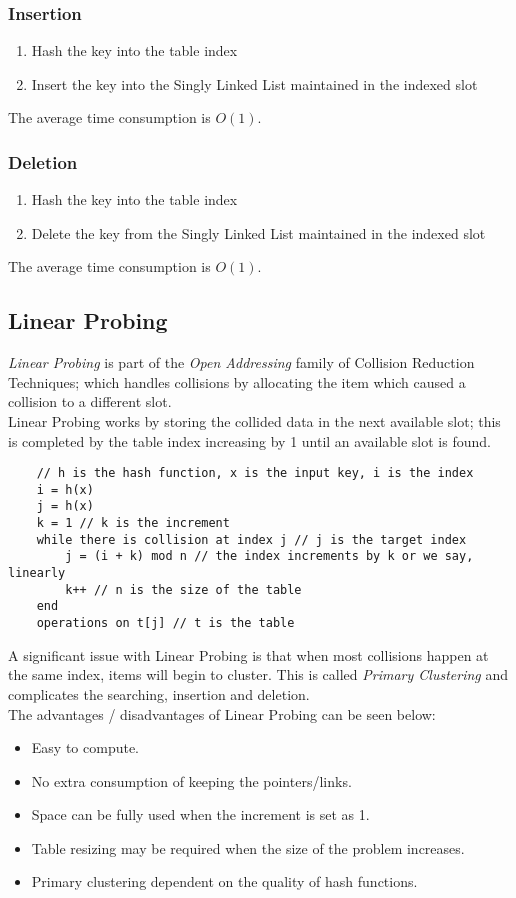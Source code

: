 \subsubsection{Insertion}
\begin{enumerate}
    \item Hash the key into the table index
    \item Insert the key into the Singly Linked List maintained in the indexed slot
\end{enumerate}
The average time consumption is $O(1)$.
\subsubsection{Deletion}
\begin{enumerate}
    \item Hash the key into the table index
    \item Delete the key from the Singly Linked List maintained in the indexed slot
\end{enumerate}
The average time consumption is $O(1)$.

\subsection{Linear Probing}
\textit{Linear Probing} is part of the \textit{Open Addressing} family of Collision Reduction Techniques; which handles collisions by allocating the item which caused a collision to a different slot.\\

Linear Probing works by storing the collided data in the next available slot; this is completed by the table index increasing by 1 until an available slot is found.
\begin{verbatim}
    // h is the hash function, x is the input key, i is the index
    i = h(x)
    j = h(x) 
    k = 1 // k is the increment
    while there is collision at index j // j is the target index
        j = (i + k) mod n // the index increments by k or we say, linearly
        k++ // n is the size of the table
    end
    operations on t[j] // t is the table
\end{verbatim}
A significant issue with Linear Probing is that when most collisions happen at the same index, items will begin to cluster. This is called \textit{Primary Clustering} and complicates the searching, insertion and deletion.\\

The advantages / disadvantages of Linear Probing can be seen below:
\begin{itemize}
    \item Easy to compute.
    \item No extra consumption of keeping the pointers/links.
    \item Space can be fully used when the increment is set as 1.
    \item Table resizing may be required when the size of the problem increases.
    \item Primary clustering dependent on the quality of hash functions.
\end{itemize}

